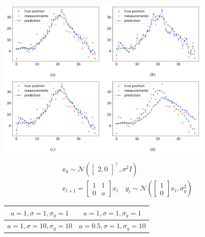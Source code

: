 \documentclass[landscape,a0paper,fontscale=0.285]{baposter} %
\begin{document}
\begin{poster}
{\begin{center}
    \includegraphics[width=0.8\textwidth,trim={0cm 4cm 0 3cm},clip]{figures/czu87jWDYg1FQRy.png}
\end{center}
\vspace{-0.3cm}
$$
\begin{aligned}
x_0\sim \mathcal N(\left[\begin{smallmatrix}
2,0
\end{smallmatrix}\right]^\top,\sigma^2 I) 
\\
x_{t+1} = 
\left[\begin{smallmatrix}
1 & 1 \\ 0 & a
\end{smallmatrix}\right]x_t
\quad
y_t\sim  \mathcal N (\left[\begin{smallmatrix}
    1 \\ 0 
\end{smallmatrix}\right] x_t, \sigma_y^2)
\end{aligned}
$$

\begin{tabular}{c|c}
    $a=1, \sigma=1, \sigma_y=1$& $a=1,\sigma=1,\sigma_y=1$ \\\hline
    $a=1, \sigma=10, \sigma_y=10$ & $a=0.5,\sigma=1,\sigma_y=10$ \\
\end{tabular}


}


\end{poster}
\end{document}

